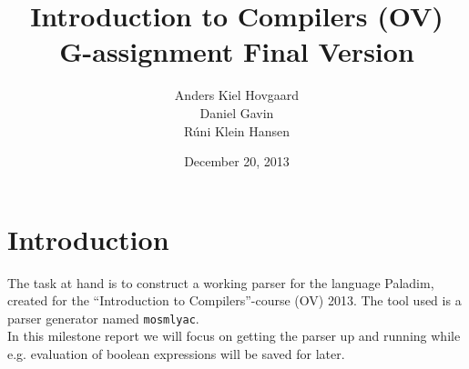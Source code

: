 \documentclass[12pt,a4paper]{article}
\begin{document}
\title{Introduction to Compilers (OV)\\
       G-assignment Final Version}
\author{Anders Kiel Hovgaard\\
        Daniel Gavin\\
        Rúni Klein Hansen}
\date{December 20, 2013}
\maketitle

\section{Introduction}
The task at hand is to construct a working parser for the language Paladim,
created for the ``Introduction to Compilers''-course (OV) 2013. The tool used is
a parser generator named \texttt{mosmlyac}.\\
In this milestone report we will focus on getting the parser up and running
while e.g. evaluation of boolean expressions will be saved for later.
\end{document}
